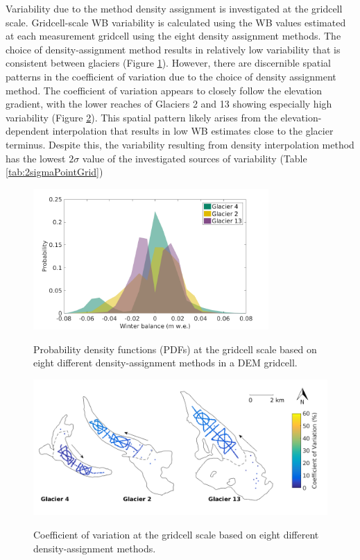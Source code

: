 \documentclass{sfuthesis}
\begin{document}
{Variability due to the method density assignment is investigated at the gridcell scale. Gridcell-scale WB variability is calculated using the WB values estimated at each measurement gridcell using the eight density assignment methods. The choice of density-assignment method results in relatively low variability that is consistent between glaciers (Figure \ref{fig:SWEvar_Density_hist}). However, there are discernible spatial patterns in the coefficient of variation due to the choice of density assignment method. The coefficient of variation appears to closely follow the elevation gradient, with the lower reaches of Glaciers 2 and 13 showing especially high variability (Figure \ref{fig:SWEvar_Density_map}). This spatial pattern likely arises from the elevation-dependent interpolation that results in low WB estimates close to the glacier terminus. Despite this, the variability resulting from density interpolation method has the lowest $2\sigma$ value of the investigated sources of variability (Table  \ref{tab:2sigmaPointGrid})

\begin{figure}[H]
	\centering
	\includegraphics[width =0.8\textwidth]{SWEvarDensityHIST.png}\\
	\caption{Probability density functions (PDFs) at the gridcell scale based on eight different density-assignment methods in a DEM gridcell.}
	\label{fig:SWEvar_Density_hist}
\end{figure}

\begin{figure}[H]
	\centering
	\includegraphics[width =\textwidth]{Map_cellstd_density.png}\\
	\caption{Coefficient of variation at the gridcell scale based on eight different density-assignment methods.}
	\label{fig:SWEvar_Density_map}
\end{figure}



}
\end{document}
